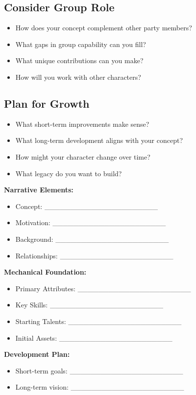 \subsection*{Consider Group Role}
\begin{itemize}
\item How does your concept complement other party members?
\item What gaps in group capability can you fill?
\item What unique contributions can you make?
\item How will you work with other characters?
\end{itemize}

\subsection*{Plan for Growth}
\begin{itemize}
\item What short-term improvements make sense?
\item What long-term development aligns with your concept?
\item How might your character change over time?
\item What legacy do you want to build?
\end{itemize}

\begin{tcolorbox}[colback=green!5!white,colframe=green!75!black,title=Character Concept Worksheet,fonttitle=\bfseries]
\textbf{Narrative Elements:}
\begin{itemize}
\item Concept: \_\_\_\_\_\_\_\_\_\_\_\_\_\_\_\_\_\_\_\_\_\_
\item Motivation: \_\_\_\_\_\_\_\_\_\_\_\_\_\_\_\_\_\_\_\_\_\_
\item Background: \_\_\_\_\_\_\_\_\_\_\_\_\_\_\_\_\_\_\_\_\_\_
\item Relationships: \_\_\_\_\_\_\_\_\_\_\_\_\_\_\_\_\_\_\_\_\_\_
\end{itemize}

\textbf{Mechanical Foundation:}
\begin{itemize}
\item Primary Attributes: \_\_\_\_\_\_\_\_\_\_\_\_\_\_\_\_\_\_\_\_\_\_
\item Key Skills: \_\_\_\_\_\_\_\_\_\_\_\_\_\_\_\_\_\_\_\_\_\_
\item Starting Talents: \_\_\_\_\_\_\_\_\_\_\_\_\_\_\_\_\_\_\_\_\_\_
\item Initial Assets: \_\_\_\_\_\_\_\_\_\_\_\_\_\_\_\_\_\_\_\_\_\_
\end{itemize}

\textbf{Development Plan:}
\begin{itemize}
\item Short-term goals: \_\_\_\_\_\_\_\_\_\_\_\_\_\_\_\_\_\_\_\_\_\_
\item Long-term vision: \_\_\_\_\_\_\_\_\_\_\_\_\_\_\_\_\_\_\_\_\_\_
\end{itemize}
\end{tcolorbox}

